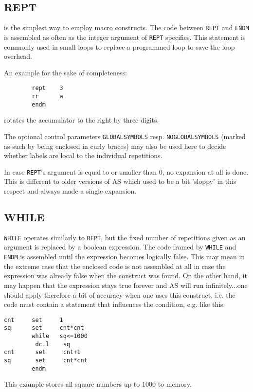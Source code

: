 \documentclass[12pt,twoside]{report}
\makeatletter
\newcommand{\tty}[1]{{\tt #1}}
\newcommand{\ttindex}[1]{\index{#1@{\tt #1}}}
\newcommand{\asname}{{AS}}
\makeatother
\begin{document}
\subsection{REPT}
\ttindex{REPT}

is the simplest way to employ macro constructs.  The code between
\tty{REPT} and \tty{ENDM} is assembled as often as the integer argument of
\tty{REPT} specifies.  This statement is commonly used in small loops to
replace a programmed loop to save the loop overhead.

An example for the sake of completeness:
\begin{verbatim}
        rept    3
        rr      a
        endm
\end{verbatim}
rotates the accumulator to the right by three digits.

The optional control parameters \tty{GLOBALSYMBOLS}
resp. \tty{NOGLOBALSYMBOLS} (marked as such by being enclosed in curly
braces) may also be used here to decide whether labels are local to the
individual repetitions.

In case \tty{REPT}'s argument is equal to or smaller than 0, no expansion
at all is done.  This is different to older versions of \asname{} which used to
be a bit 'sloppy' in this respect and always made a single expansion.


\subsection{WHILE}
\ttindex{WHILE}

\tty{WHILE} operates similarly to \tty{REPT}, but the fixed number of
repetitions given as an argument is replaced by a boolean expression.  The
code framed by \tty{WHILE} and \tty{ENDM} is assembled until the
expression becomes logically false.  This may mean in the extreme case
that the enclosed code is not assembled at all in case the expression was
already false when the construct was found.  On the other hand, it may
happen that the expression stays true forever and \asname{} will run
infinitely...one should apply therefore a bit of accuracy when one uses
this construct, i.e. the code must contain a statement that influences the
condition, e.g. like this:
\begin{verbatim}
cnt     set     1
sq      set     cnt*cnt
        while   sq<=1000
         dc.l    sq
cnt      set     cnt+1
sq       set     cnt*cnt
        endm
\end{verbatim}
This example stores all square numbers up to 1000 to memory.
\end{document}
